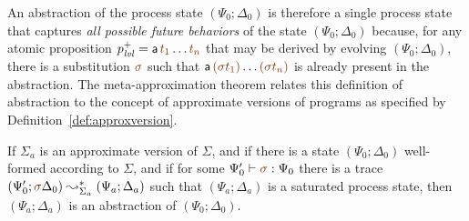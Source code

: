An abstraction of the process state $(\Psi_0; \Delta_0)$ is therefore
a single process state that captures {\it all possible future
  behaviors} of the state $(\Psi_0; \Delta_0)$ because, for any atomic
proposition $p^+_\mlvl = {\sf a}\,\lf{t_1}\ldots \lf{t_n}$ that may be derived
by evolving $(\Psi_0; \Delta_0)$, there is a substitution $\lf\sigma$
such that ${\sf a}\,\lf{(\sigma t_1)}\ldots\lf{(\sigma t_n)}$ is already present
in the abstraction. The meta-approximation theorem relates this definition
of abstraction to the concept of approximate versions of programs as
specified by Definition~\ref{def:approxversion}.  

\bigskip
\begin{theorem}\label{thm:metapprox}
  If $\Sigma_a$ is an approximate version of $\Sigma$, and if there is a
  state $(\Psi_0; \Delta_0)$ well-formed according to $\Sigma$, and if
  for some $\Psi_0' \vdash \lf\sigma : \Psi_0$ there is a trace
  $(\Psi_0'; \lf\sigma\Delta_0) \leadsto^*_{\Sigma_a} (\Psi_a; \Delta_a)$
  such that $(\Psi_a; \Delta_a)$ is a saturated process state, then
  $(\Psi_a; \Delta_a)$ is an abstraction of $(\Psi_0; \Delta_0)$.
\end{theorem}

